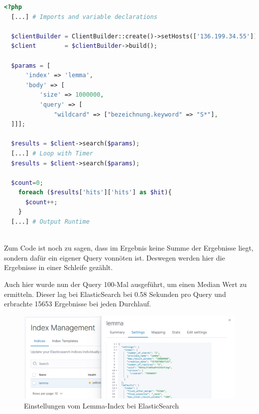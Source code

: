 \begin{lstlisting}[language=php, frame=single, label={lst:phpElastic}, 
  morekeywords={type,uninvertible,indexed,stored,field,multiValued, name}] 
  <?php
  [...] # Imports and variable declarations

  $clientBuilder = ClientBuilder::create()->setHosts(['136.199.34.55']);
  $client        = $clientBuilder->build();

  $params = [
      'index' => 'lemma',
      'body' => [
          'size' => 1000000,
          'query' => [
              "wildcard" => ["bezeichnung.keyword" => "S*"],
  ]]];
  
  $results = $client->search($params);
  [...] # Loop with Timer  
  $results = $client->search($params);

  $count=0;
    foreach ($results['hits']['hits'] as $hit){
      $count++;
    }
  [...] # Output Runtime
  
\end{lstlisting}

Zum Code ist noch zu sagen, dass im Ergebnis keine Summe der Ergebnisse liegt, sondern dafür ein eigener Query vonnöten ist. Deswegen werden hier die Ergebnisse in einer Schleife gezählt.

Auch hier wurde nun der Query 100-Mal ausgeführt, um einen Median Wert zu ermitteln. Dieser lag bei ElasticSearch bei 0.58 Sekunden pro Query und erbrachte 15653 Ergebnisse bei jeden Durchlauf.

\begin{figure}
	\centering
	\includegraphics[width=1\linewidth]{images/elastic_index_settings.png}
	\caption{Einstellungen vom Lemma-Index bei ElasticSearch}
	\label{img:elasticIndexSettings}
\end{figure}


